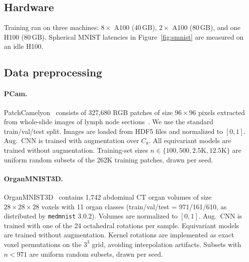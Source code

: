 \documentclass{article}
\theoremstyle{definition}
\theoremstyle{remark}
\theoremstyle{definition}
\begin{document}
\subsection{Hardware}

Training ran on three machines: $8\times$ A100 (40\,GB), $2\times$ A100 (80\,GB), and one
H100 (80\,GB). Spherical MNIST latencies in Figure~\ref{fig:smnist} are measured on an
idle H100.

\subsection{Data preprocessing}

\paragraph{PCam.}
PatchCamelyon~\citep{veeling2018rotation} consists of 327{,}680 RGB
patches of size $96 \times 96$ pixels extracted from whole-slide
images of lymph node sections~\citep{bejnordi2017camelyon}. We use
the standard train/val/test split. Images are loaded from HDF5 files
and normalized to $[0, 1]$. Aug.\ CNN is trained with augmentation over $C_8$. All
equivariant models are trained without augmentation. Training-set sizes
$n \in \{100, 500, 2.5\mathrm{K}, 12.5\mathrm{K}\}$ are uniform random subsets of the 262K
training patches, drawn per seed.

\paragraph{OrganMNIST3D.}
OrganMNIST3D~\citep{medmnistv2} contains 1{,}742 abdominal CT organ
volumes of size $28 \times 28 \times 28$ voxels with 11 organ classes
(train/val/test = 971/161/610, as distributed by \texttt{medmnist} 3.0.2). Volumes are normalized to $[0, 1]$.
Aug.\ CNN is trained with one of the 24 octahedral rotations per sample.
Equivariant models are trained without augmentation. Kernel rotations are implemented as exact
voxel permutations on the $3^3$ grid, avoiding interpolation artifacts. Subsets with
$n < 971$ are uniform random subsets, drawn per seed.
\end{document}
